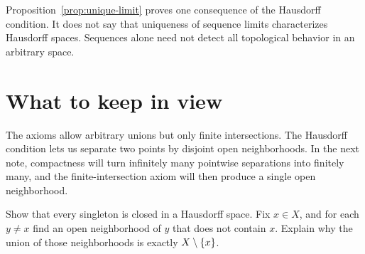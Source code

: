 \documentclass[11pt]{article}
\begin{document}
\begin{remark}
Proposition~\ref{prop:unique-limit} proves one consequence of the
Hausdorff condition. It does not say that uniqueness of sequence limits
characterizes Hausdorff spaces. Sequences alone need not detect all
topological behavior in an arbitrary space.
\end{remark}

\section{What to keep in view}
The axioms allow arbitrary unions but only finite intersections.
The Hausdorff condition lets us separate two points by disjoint open
neighborhoods. In the next note, compactness will turn infinitely many
pointwise separations into finitely many, and the finite-intersection
axiom will then produce a single open neighborhood.

\begin{exercise}
Show that every singleton is closed in a Hausdorff space. Fix $x\in X$,
and for each $y\ne x$ find an open neighborhood of $y$ that does not
contain $x$. Explain why the union of those neighborhoods is exactly
$X\setminus\left\{x\right\}$.
\end{exercise}
\end{document}
